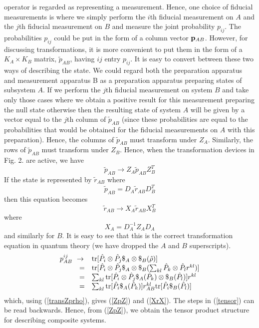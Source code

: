 \documentclass[12pt]{article}
\begin{document}
operator is regarded as representing a measurement.
Hence, one choice of fiducial measurements is where we simply
perform the $i$th fiducial measurement on $A$ and the $j$th fiducial
measurement on $B$ and measure the joint probability $p_{ij}$.
The probabilities $p_{ij}$ could be put in the form
of a column vector ${\bf p}_{AB}$.  However, for discussing transformations,
it is more convenient to put them in the form of a $K_A \times K_B$
matrix, $\tilde{p}_{AB}$, having $ij$ entry $p_{ij}$. It is easy to
convert between these two ways of describing the state.  We could
regard both the preparation apparatus and measurement apparatus B as a
preparation apparatus preparing states of subsystem $A$.  If we perform
the $j$th fiducial measurement on system $B$ and take only those cases
where we obtain a positive result for this measurement preparing the
null state otherwise then the
resulting state of system $A$ will be given by a vector equal to
the $j$th column of $\tilde{p}_{AB}$ (since these probabilities are
equal to the probabilities that would be obtained for the
fiducial measurements on $A$ with this preparation).  Hence, the columns
of $\tilde{p}_{AB}$ must transform under $Z_A$.
Similarly, the rows of $\tilde{p}_{AB}$ must
transform under $Z_B$.  Hence, when the transformation devices in Fig.
2. are active, we have
\begin{equation}\label{ZpZ}
\tilde{p}_{AB} \rightarrow Z_A \tilde{p}_{AB} Z_B^T
\end{equation}
If the state is represented by $\tilde{r}_{AB}$ where
\begin{equation}
\tilde{p}_{AB}=D_A\tilde{r}_{AB}D_B^T
\end{equation}
then this equation
becomes
\begin{equation}\label{XrX}
\tilde{r}_{AB} \rightarrow X_A \tilde{r}_{AB} X_B^T
\end{equation}
where
\begin{equation}
X_A=D^{-1}_AZ_AD_A
\end{equation}
and similarly for $B$.
It is easy to see that this is the correct transformation equation in
quantum theory (we have dropped the $A$ and $B$ superscripts).
\begin{equation}\label{tensor}
\begin{array}{rcl}
p^{ij}_{AB} &\!\!\! \rightarrow & {\rm tr}
[\hat{P}_i\otimes\hat{P}_j \$_A\otimes\$_B (\hat{\rho})  ] \\
 {} & = & {\rm tr}[\hat{P}_i\otimes\hat{P}_j\$_A\otimes\$_B
 (\sum_{kl}\hat{P}_k\otimes\hat{P}_l r^{kl} )] \\
 { } & = & \sum_{kl}{\rm tr}[\hat{P}_i\otimes\hat{P}_j
 \$_A(\hat{P}_k)\otimes\$_B(\hat{P}_l)] r^{kl} \\
 {} & = &  \sum_{kl} {\rm tr}[\hat{P}_i\$_A(\hat{P}_k)]
 r_{AB}^{kl} {\rm tr} [\hat{P}_i\$_B(\hat{P}_l)]
 \end{array}
\end{equation}
which, using (\ref{transZprho}), gives (\ref{ZpZ}) and (\ref{XrX}).  The steps
in (\ref{tensor}) can
be read backwards.  Hence, from (\ref{ZpZ}), we obtain the
tensor product structure for describing composite systems.
\end{document}
